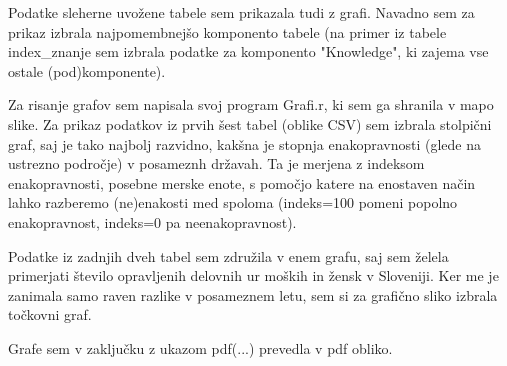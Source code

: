 \documentclass[11pt,a4paper]{article}
\begin{document}
Podatke sleherne uvožene tabele sem prikazala tudi z grafi. Navadno sem za prikaz izbrala najpomembnejšo komponento tabele (na primer iz tabele index\_znanje sem izbrala podatke za komponento "Knowledge", ki zajema vse ostale (pod)komponente). 

Za risanje grafov sem napisala svoj program Grafi.r, ki sem ga shranila v mapo slike.
Za prikaz podatkov iz prvih šest tabel (oblike CSV) sem izbrala stolpični graf, saj je tako najbolj razvidno, kakšna je stopnja enakopravnosti (glede na ustrezno področje) v posameznh  državah. Ta je merjena z indeksom enakopravnosti, posebne merske enote, s pomočjo katere na enostaven način lahko razberemo (ne)enakosti med spoloma (indeks=100 pomeni popolno enakopravnost, indeks=0 pa neenakopravnost).

Podatke iz zadnjih dveh tabel sem združila v enem grafu, saj sem želela primerjati število opravljenih delovnih ur moških in žensk v Sloveniji. Ker me je zanimala samo raven razlike v posameznem letu, sem si za grafično sliko izbrala točkovni graf.

Grafe sem v zaključku z ukazom pdf(...) prevedla v pdf obliko.






\end{document}
